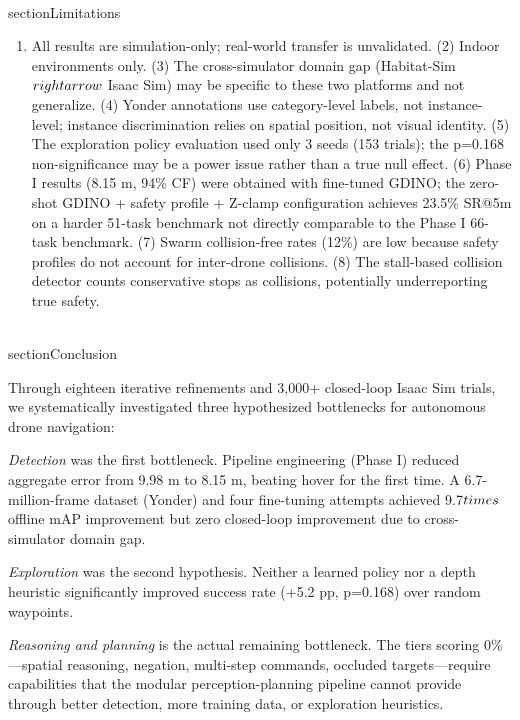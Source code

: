 \documentclass[conference]{IEEEtran}
\begin{document}
\\section{Limitations}\label{ix.-limitations}

\begin{enumerate}
\def\labelenumi{(\arabic{enumi})}
\tightlist
\item
  All results are simulation-only; real-world transfer is unvalidated.
  (2) Indoor environments only. (3) The cross-simulator domain gap
  (Habitat-Sim $\\rightarrow$ Isaac Sim) may be specific to these two platforms and
  not generalize. (4) Yonder annotations use category-level labels,
  not instance-level; instance discrimination relies on spatial
  position, not visual identity. (5) The exploration policy evaluation
  used only 3 seeds (153 trials); the p=0.168 non-significance may be a
  power issue rather than a true null effect. (6) Phase I results (8.15
  m, 94\% CF) were obtained with fine-tuned GDINO; the zero-shot GDINO +
  safety profile + Z-clamp configuration achieves 23.5\% SR@5m on a
  harder 51-task benchmark not directly comparable to the Phase I
  66-task benchmark. (7) Swarm collision-free rates (12\%) are low
  because safety profiles do not account for inter-drone collisions. (8)
  The stall-based collision detector counts conservative stops as
  collisions, potentially underreporting true safety.
\end{enumerate}

\\section{Conclusion}\label{x.-conclusion}

Through eighteen iterative refinements and 3,000+ closed-loop Isaac Sim
trials, we systematically investigated three hypothesized bottlenecks
for autonomous drone navigation:

\emph{Detection} was the first bottleneck. Pipeline engineering (Phase
I) reduced aggregate error from 9.98 m to 8.15 m, beating hover for the
first time. A 6.7-million-frame dataset (Yonder) and four fine-tuning
attempts achieved 9.7$\\times$ offline mAP improvement but zero closed-loop
improvement due to cross-simulator domain gap.

\emph{Exploration} was the second hypothesis. Neither a learned policy
nor a depth heuristic significantly improved success rate (+5.2 pp,
p=0.168) over random waypoints.

\emph{Reasoning and planning} is the actual remaining bottleneck. The
tiers scoring 0\%---spatial reasoning, negation, multi-step commands,
occluded targets---require capabilities that the modular
perception-planning pipeline cannot provide through better detection,
more training data, or exploration heuristics.
\end{document}
